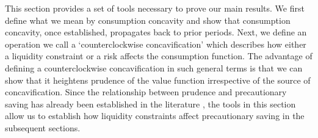  This section provides a set of tools necessary to prove our main results. We first define what we mean by consumption concavity and show that consumption concavity, once established, propagates back to prior periods. Next, we define an operation we call a `counterclockwise concavification' which describes how either a liquidity constraint or a risk affects the consumption function. The advantage of defining a counterclockwise concavification in such general terms is that we can show that it heightens prudence of the value function irrespective of the source of concavification. Since the relationship between prudence and precautionary saving has already been established in the literature \citep{kimball:smallandlarge}, the tools in this section allow us to establish how liquidity constraints affect precautionary saving in the subsequent sections.
